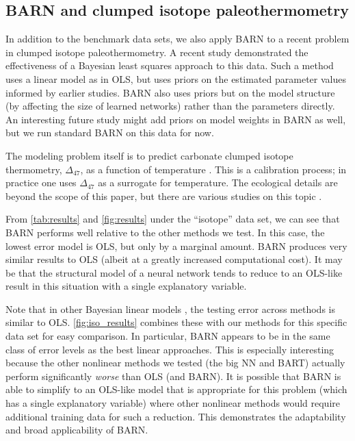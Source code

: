 \documentclass[12pt]{article}
\begin{document}
\subsection{BARN and clumped isotope paleothermometry}\label{subsec:therm}

In addition to the benchmark data sets, we also apply BARN to a recent problem in clumped isotope paleothermometry.  A recent study \cite{roman2022bayclump} demonstrated the effectiveness of a Bayesian least squares approach to this data.  Such a method uses a linear model as in OLS, but uses priors on the estimated parameter values informed by earlier studies.  BARN also uses priors but on the model structure (by affecting the size of learned networks) rather than the parameters directly.  An interesting future study might add priors on model weights in BARN as well, but we run standard BARN on this data for now.

The modeling problem itself is to predict carbonate clumped isotope thermometry, $\Delta_{47}$, as a function of temperature \cite{eiler200418o13c16o}.  This is a calibration process; in practice one uses $\Delta_{47}$ as a surrogate for temperature.  The ecological details are beyond the scope of this paper, but there are various studies on this topic \cite{eiler200418o13c16o,roman2022bayclump,petersen2019effects}.

From \autoref{tab:results} and \autoref{fig:results} under the ``isotope'' data set, we can see that BARN performs well relative to the other methods we test.  In this case, the lowest error model is OLS, but only by a marginal amount.  BARN produces very similar results to OLS (albeit at a greatly increased computational cost).  It may be that the structural model of a neural network tends to reduce to an OLS-like result in this situation with a single explanatory variable.

Note that in other Bayesian linear models \cite{roman2022bayclump}, the testing error across methods is similar to OLS.  \autoref{fig:iso_results} combines these with our methods for this specific data set for easy comparison.  In particular, BARN appears to be in the same class of error levels as the best linear approaches.  This is especially interesting because the other nonlinear methods we tested (the big NN and BART) actually perform significantly \emph{worse} than OLS (and BARN).  It is possible that BARN is able to simplify to an OLS-like model that is appropriate for this problem (which has a single explanatory variable) where other nonlinear methods would require additional training data for such a reduction.  This demonstrates the adaptability and broad applicability of BARN.
\end{document}
